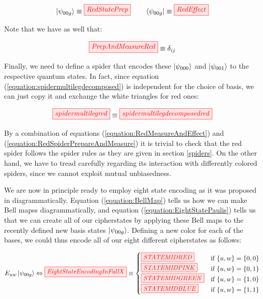 \documentclass[]{article}
\begin{document}
\begin{equation}
	\ket{\psi_{00g}} \equiv \tikzfig{RedStatePrep} ~~~~~~ \bra{\psi_{00g}} \equiv \tikzfig{RedEffect}
\end{equation}

Note that we have as well that:

\begin{equation}
\label{equation:RedMeasureAndEffect}
\tikzfig{PrepAndMeasureRed} \equiv \delta_{ij}
\end{equation}

Finally, we need to define a spider that encodes these $\ket{\psi_{000}}$ and $\ket{\psi_{001}}$ to the respective quantum states. In fact, since equation (\ref{equation:spidermultilegdecomposed}) is independent for the choice of basis, we can just copy it and exchange the white triangles for red ones:

\begin{equation}
	\label{equation:RedSpiderPrepareAndMeasure}
\tikzfig{spidermultilegred} \equiv \tikzfig{spidermultilegdecomposedred}
\end{equation}

By a combination of equations (\ref{equation:RedMeasureAndEffect}) and (\ref{equation:RedSpiderPrepareAndMeasure}) it is trivial to check that the red spider follows the spider rules as they are given in section \ref{spiders}. On the other hand, we have to tread carefully regarding its interaction with differently colored spiders, since we cannot exploit mutual unbiasedness.

We are now in principle ready to employ eight state encoding as it was proposed in \cite{DeVries2016} diagrammatically. Equation (\ref{equation:BellMap}) tells us how we can make Bell mapss diagrammatically, and equation (\ref{equation:EightStatePaulis}) tells us that we can create all of our cipherstates by applying these Bell maps to the recently defined new basis states $\ket{\psi_{00g}}$. Defining a new color for each of the bases, we could thus encode all of our eight different cipherstates as follows:

\begin{equation}
	\label{equation:EightStateEncodingInFull}
	E_{uw}\ket{\psi_{00g}} \Leftrightarrow\tikzfig{EightStateEncodingInFullX} \equiv 
	\begin{cases}
	\tikzfig{STATEMIDRED} & \text{if} ~\{u,w\} = \{0,0\} \\
	\tikzfig{STATEMIDPINK} & \text{if} ~\{u,w\} = \{0,1\} \\
	\tikzfig{STATEMIDGREEN} & \text{if} ~\{u,w\} = \{1,0\} \\
	\tikzfig{STATEMIDBLUE} & \text{if} ~\{u,w\} = \{1,1\} \\
	\end{cases}
\end{equation}
\end{document}
